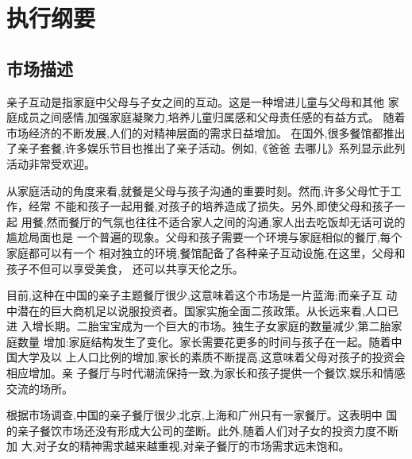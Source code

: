 \chapter{执行纲要}

\section{市场描述}
亲子互动是指家庭中父母与子女之间的互动。这是一种增进儿童与父母和其他
家庭成员之间感情,加强家庭凝聚力,培养儿童归属感和父母责任感的有益方式。
随着市场经济的不断发展,人们的对精神层面的需求日益增加。
在国外,很多餐馆都推出了亲子套餐,许多娱乐节目也推出了亲子活动。例如,《爸爸
去哪儿》系列显示此列活动非常受欢迎。

从家庭活动的角度来看,就餐是父母与孩子沟通的重要时刻。然而,许多父母忙于工作，经常
不能和孩子一起用餐,对孩子的培养造成了损失。另外,即使父母和孩子一起
用餐,然而餐厅的气氛也往往不适合家人之间的沟通,家人出去吃饭却无话可说的尴尬局面也是
一个普遍的现象。父母和孩子需要一个环境与家庭相似的餐厅,每个家庭都可以有一个
相对独立的环境,餐馆配备了各种亲子互动设施,在这里，父母和孩子不但可以享受美食，
还可以共享天伦之乐。

目前,这种在中国的亲子主题餐厅很少,这意味着这个市场是一片蓝海;而亲子互
动中潜在的巨大商机足以说服投资者。国家实施全面二孩政策。从长远来看,人口已进
入增长期。二胎宝宝成为一个巨大的市场。独生子女家庭的数量减少,第二胎家庭数量
增加:家庭结构发生了变化。家长需要花更多的时间与孩子在一起。随着中国大学及以
上人口比例的增加,家长的素质不断提高,这意味着父母对孩子的投资会相应增加。亲
子餐厅与时代潮流保持一致,为家长和孩子提供一个餐饮,娱乐和情感交流的场所。

根据市场调查,中国的亲子餐厅很少,北京,上海和广州只有一家餐厅。这表明中
国的亲子餐饮市场还没有形成大公司的垄断。此外,随着人们对子女的投资力度不断加
大,对子女的精神需求越来越重视,对亲子餐厅的市场需求远未饱和。

